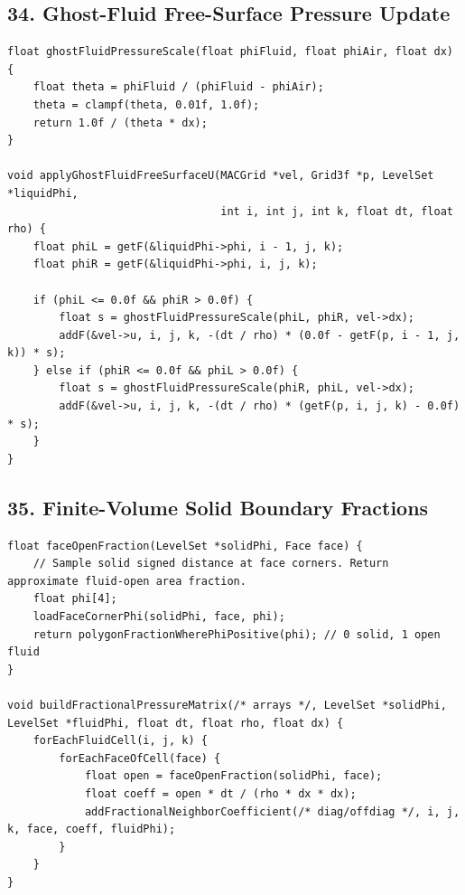 \documentclass[10pt,letterpaper]{article}
\begin{document}
\subsection*{34. Ghost-Fluid Free-Surface Pressure Update}

\begin{verbatim}
float ghostFluidPressureScale(float phiFluid, float phiAir, float dx) {
    float theta = phiFluid / (phiFluid - phiAir);
    theta = clampf(theta, 0.01f, 1.0f);
    return 1.0f / (theta * dx);
}

void applyGhostFluidFreeSurfaceU(MACGrid *vel, Grid3f *p, LevelSet *liquidPhi,
                                 int i, int j, int k, float dt, float rho) {
    float phiL = getF(&liquidPhi->phi, i - 1, j, k);
    float phiR = getF(&liquidPhi->phi, i, j, k);

    if (phiL <= 0.0f && phiR > 0.0f) {
        float s = ghostFluidPressureScale(phiL, phiR, vel->dx);
        addF(&vel->u, i, j, k, -(dt / rho) * (0.0f - getF(p, i - 1, j, k)) * s);
    } else if (phiR <= 0.0f && phiL > 0.0f) {
        float s = ghostFluidPressureScale(phiR, phiL, vel->dx);
        addF(&vel->u, i, j, k, -(dt / rho) * (getF(p, i, j, k) - 0.0f) * s);
    }
}
\end{verbatim}

\subsection*{35. Finite-Volume Solid Boundary Fractions}

\begin{verbatim}
float faceOpenFraction(LevelSet *solidPhi, Face face) {
    // Sample solid signed distance at face corners. Return approximate fluid-open area fraction.
    float phi[4];
    loadFaceCornerPhi(solidPhi, face, phi);
    return polygonFractionWherePhiPositive(phi); // 0 solid, 1 open fluid
}

void buildFractionalPressureMatrix(/* arrays */, LevelSet *solidPhi, LevelSet *fluidPhi, float dt, float rho, float dx) {
    forEachFluidCell(i, j, k) {
        forEachFaceOfCell(face) {
            float open = faceOpenFraction(solidPhi, face);
            float coeff = open * dt / (rho * dx * dx);
            addFractionalNeighborCoefficient(/* diag/offdiag */, i, j, k, face, coeff, fluidPhi);
        }
    }
}
\end{verbatim}
\end{document}
